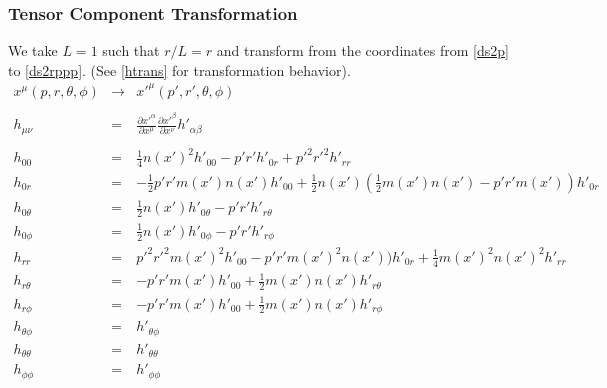 \documentclass[10pt,letterpaper]{article}
\numberwithin{equation}{section}
\begin{document}
\subsubsection{Tensor Component Transformation}
We take $L=1$ such that $r/L=r$ and transform from the coordinates from \eqref{ds2p} to \eqref{ds2rppp}. (See \eqref{htrans} for transformation behavior).
\begin{eqnarray}
x^\mu (p,r,\theta,\phi) &\to& x'^\mu (p',r',\theta,\phi)
\\ \nonumber\\
h_{\mu\nu} &=& \frac{\partial x'^\alpha}{\partial x^\mu }\frac{\partial x'^\beta}{\partial x^\nu} h'_{\alpha\beta}
\\ \nonumber\\
h_{00} &=&  \tfrac14 n(x')^2 h'_{00} -p'r' h'_{0r} + p'^2 r'^2 h'_{rr}
\nonumber\\
h_{0r} &=& -\tfrac12 p'r'm(x')n(x') h'_{00} + \tfrac12 n(x')\left(\tfrac{1}{2}m(x')n(x')-p'r'm(x')\right)h'_{0r}
\nonumber\\
h_{0\theta} &=&\tfrac12 n(x') h'_{0\theta} -p'r' h'_{r\theta}
\nonumber\\
h_{0\phi} &=&\tfrac12 n(x') h'_{0\phi} -p'r' h'_{r\phi}
\nonumber\\
h_{rr} &=& p'^2 r'^2 m(x')^2 h'_{00} -p'r'm(x')^2n(x'))h'_{0r}+\tfrac14 m(x')^2n(x')^2 h'_{rr}
\nonumber\\
h_{r\theta} &=&  -p'r'm(x') h'_{00} + \tfrac12 m(x')n(x') h'_{r\theta}
\nonumber\\
h_{r\phi} &=&  -p'r'm(x') h'_{00} + \tfrac12 m(x')n(x') h'_{r\phi}
\nonumber\\
h_{\theta\phi} &=& h'_{\theta\phi}
\nonumber\\
h_{\theta\theta} &=& h'_{\theta\theta}
\nonumber\\
h_{\phi\phi} &=& h'_{\phi\phi}
\end{eqnarray}
\end{document}
